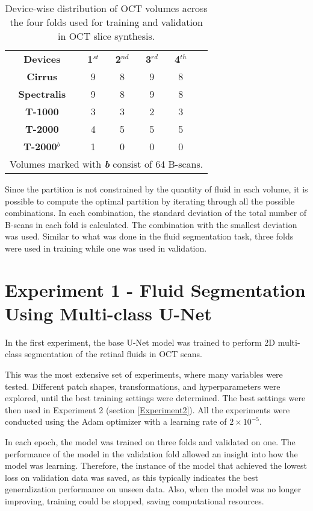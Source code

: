 \begin{table*}[!ht]
	\setlength{\tabcolsep}{6pt}
	\renewcommand{\arraystretch}{1.3}
	\caption{Device-wise distribution of OCT volumes across the four folds used for training and validation in OCT slice synthesis.}
	\centering
	\begin{tabular}{|c|c|c|c|c|c}
		\cline{1-5}
		\textbf{Devices} & \textbf{1$^{st}$} & \textbf{2$^{nd}$} & \textbf{3$^{rd}$} & \textbf{4$^{th}$} & \\
		\cline{1-5}
		\textbf{Cirrus} & 9 & 8 & 9 & 8 & \\
		\textbf{Spectralis} & 9 & 8 & 9 & 8 & \\
		\textbf{T-1000} & 3 & 3 & 2 & 3 & \\
		\textbf{T-2000} & 4 & 5 & 5 & 5 & \\
		\textbf{T-2000$^{b}$} & 1 & 0 & 0 & 0 & \\
		\cline{1-5}
		\multicolumn{6}{l}{Volumes marked with \textbf{\textit{b}} consist of 64 B-scans.} \\
	\end{tabular}
	\label{tab:FourFoldSplit}
\end{table*}
	
Since the partition is not constrained by the quantity of fluid in each volume, it is possible to compute the optimal partition by iterating through all the possible combinations. In each combination, the standard deviation of the total number of B-scans in each fold is calculated. The combination with the smallest deviation was used. Similar to what was done in the fluid segmentation task, three folds were used in training while one was used in validation.

\section{Experiment 1 - Fluid Segmentation Using Multi-class U-Net}\label{Experiment1}

In the first experiment, the base U-Net model was trained to perform 2D multi-class segmentation of the retinal fluids in OCT scans.
\par
This was the most extensive set of experiments, where many variables were tested. Different patch shapes, transformations, and hyperparameters were explored, until the best training settings were determined. The best settings were then used in Experiment 2 (section \ref{Experiment2}). All the experiments were conducted using the Adam optimizer \parencite{Kingma2015} with a learning rate of $2 \times 10^{-5}$.
\par
In each epoch, the model was trained on three folds and validated on one. The performance of the model in the validation fold allowed an insight into how the model was learning. Therefore, the instance of the model that achieved the lowest loss on validation data was saved, as this typically indicates the best generalization performance on unseen data. Also, when the model was no longer improving, training could be stopped, saving computational resources.

